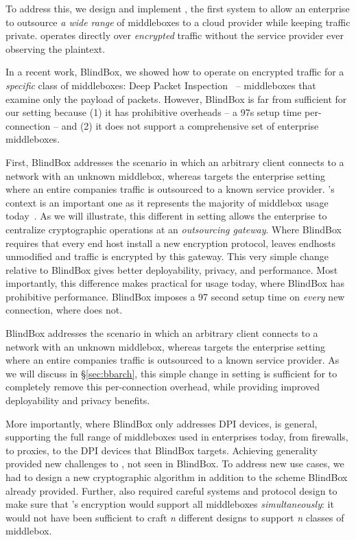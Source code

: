 To address this, we design and implement \sys, the first system to allow an enterprise to outsource {\it a wide range} of middleboxes  to a cloud provider while keeping traffic private. 
\sys operates directly over {\it encrypted} traffic without the service provider ever observing the plaintext.



In a recent work, BlindBox, we showed how to operate on encrypted traffic for a {\em specific} class of middleboxes: Deep Packet Inspection~\cite{blindbox} -- middleboxes that examine only the payload of packets. 
However, BlindBox is far from sufficient for our setting because (1) it has prohibitive overheads -- a 97s setup time per-connection -- and  (2) it  does not support a comprehensive set of enterprise middleboxes.
 
First, BlindBox addresses the scenario in which an arbitrary client connects to a network with an unknown middlebox, whereas \sys targets the enterprise setting where an entire companies traffic is outsourced to a known service provider.
\sys's context is an important one as it represents the majority of middlebox usage today~\cite{need-citation}. 
As we will illustrate, this different in setting allows the enterprise to centralize cryptographic operations at an {\it outsourcing gateway}.
Where BlindBox requires that every end host install a new encryption protocol, \sys leaves endhosts unmodified and traffic is encrypted by this gateway.
This very simple change relative to BlindBox gives \sys better deployability, privacy, and performance.
Most importantly, this difference makes \sys practical for usage today, where BlindBox has prohibitive performance.
BlindBox imposes a 97 second setup time on {\it every} new connection, where \sys does not.

BlindBox addresses the scenario in which an arbitrary client connects to a network with an unknown middlebox, whereas \sys targets the enterprise setting where an entire companies traffic is outsourced to a known service provider. 
As we will discuss in \S\ref{sec:bbarch}, this simple change in setting is sufficient for \sys to completely remove this per-connection overhead, while providing improved deployability and privacy benefits.

More importantly, where BlindBox only addresses DPI devices, \sys is general, supporting the full range of middleboxes used in enterprises today, from firewalls, to proxies, to the DPI devices that BlindBox targets.
Achieving generality provided new challenges to \sys, not seen in BlindBox. 
To address new use cases, we had to design a new cryptographic algorithm in addition to the scheme BlindBox already provided. 
Further, \sys also required careful systems and protocol design to make sure that \sys's encryption would support all middleboxes {\it simultaneously}: it would not have been sufficient to craft {\it n} different designs to support {\it n} classes of middlebox.

